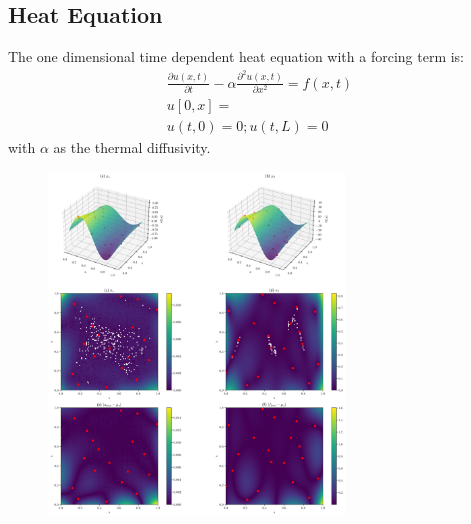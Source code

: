 \documentclass{article}
\begin{document}
    

\subsection{Heat Equation}
The one dimensional time dependent heat equation with a forcing term is:
\begin{equation}
    \begin{aligned}
        \frac{\partial u(x,t)}{\partial t} - \alpha \frac{\partial^2 u(x,t)}{\partial x^2} = f(x,t) \\ u[0,x] =\\ u(t,0) = 0; u(t,L) = 0
    \end{aligned}
\end{equation}
with $\alpha$ as the thermal diffusivity.
\begin{figure}
    \centering
    \includegraphics[width=0.7\textwidth]{../final_examples/heat_equation/merged_plots.png}
    \caption{}
    ~\label{fig:training_points_wave}
\end{figure}
\end{document}
